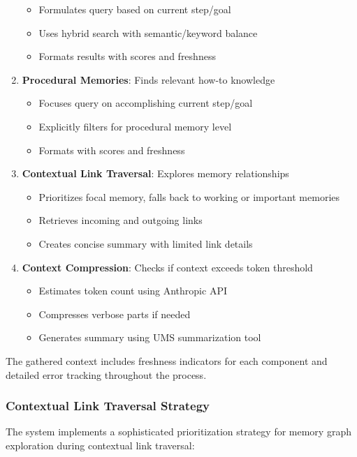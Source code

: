 \documentclass[12pt,a4paper]{article}
\begin{document}
\begin{enumerate}[label=\arabic*.]
\begin{itemize}
        \item Formulates query based on current step/goal
        \item Uses hybrid search with semantic/keyword balance
        \item Formats results with scores and freshness
    \end{itemize}
    \item \textbf{Procedural Memories}: Finds relevant how-to knowledge
    \begin{itemize}
        \item Focuses query on accomplishing current step/goal
        \item Explicitly filters for procedural memory level
        \item Formats with scores and freshness
    \end{itemize}
    \item \textbf{Contextual Link Traversal}: Explores memory relationships
    \begin{itemize}
        \item Prioritizes focal memory, falls back to working or important memories
        \item Retrieves incoming and outgoing links
        \item Creates concise summary with limited link details
    \end{itemize}
    \item \textbf{Context Compression}: Checks if context exceeds token threshold
    \begin{itemize}
        \item Estimates token count using Anthropic API
        \item Compresses verbose parts if needed
        \item Generates summary using UMS summarization tool
    \end{itemize}
\end{enumerate}

The gathered context includes freshness indicators for each component and detailed error tracking throughout the process.

\subsubsection*{Contextual Link Traversal Strategy}

The system implements a sophisticated prioritization strategy for memory graph exploration during contextual link traversal:
\end{document}
